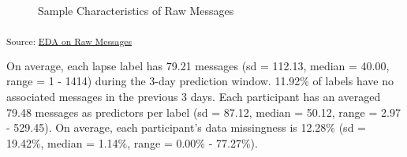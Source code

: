 \documentclass[
  letterpaper,
  DIV=11,
  numbers=noendperiod]{scrartcl}
\begin{document}
\begin{figure}[H]


\caption{\label{fig-raw}Sample Characteristics of Raw Messages}

\end{figure}%

\textsubscript{Source:
\href{https://jjcurtin.github.io/study_messages/notebooks/fig_eda_messages-preview.html\#cell-fig-raw}{EDA
on Raw Messages}}

On average, each lapse label has 79.21 messages (sd = 112.13, median =
40.00, range = 1 - 1414) during the 3-day prediction window. 11.92\% of
labels have no associated messages in the previous 3 days. Each
participant has an averaged 79.48 messages as predictors per label (sd =
87.12, median = 50.12, range = 2.97 - 529.45). On average, each
participant's data missingness is 12.28\% (sd = 19.42\%, median =
1.14\%, range = 0.00\% - 77.27\%).
\end{document}
